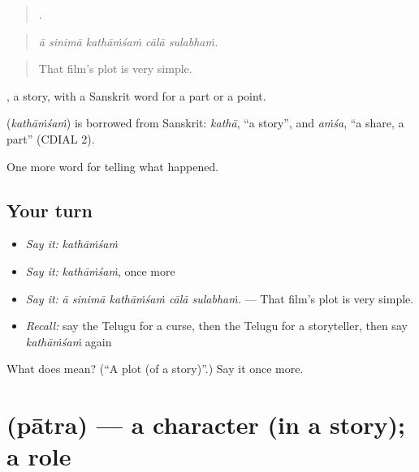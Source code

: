 \begin{quote}
    .
\end{quote}

\begin{quote}
\emph{ā sinimā kathāṁśaṁ cālā sulabhaṁ.}
\end{quote}

\begin{quote}
That film's plot is very simple.
\end{quote}

, a story, with a Sanskrit word for a part or a point.

\begin{cousinweb}
\textbf{} (\emph{kathāṁśaṁ}) is borrowed from Sanskrit: \emph{kathā}, \textquotedblleft{}a story\textquotedblright{}, and \emph{aṁśa}, \textquotedblleft{}a share, a part\textquotedblright{} (CDIAL 2).
\end{cousinweb}

\begin{grammarlens}[title={What you've built}]
One more word for telling what happened.
\end{grammarlens}

\subsection*{Your turn}
\begin{itemize}
\raggedright
  \item \emph{Say it:} \emph{kathāṁśaṁ}
  \item \emph{Say it:} \emph{kathāṁśaṁ}, once more
  \item \emph{Say it:} \emph{ā sinimā kathāṁśaṁ cālā sulabhaṁ.} — That film's plot is very simple.
  \item \emph{Recall:} say the Telugu for a curse, then the Telugu for a storyteller, then say \emph{kathāṁśaṁ} again
\end{itemize}

\begin{tcolorbox}[breakable,colback=teal!4,colframe=teal!35!black,title={Before you move on}]
What does  mean? (\textquotedblleft{}A plot (of a story)\textquotedblright{}.) Say it once more.
\end{tcolorbox}
\section[\texorpdfstring{\te{పాత్ర} (pātra)}{పాత్ర (pātra)}]{ (pātra) — a character (in a story); a role}

